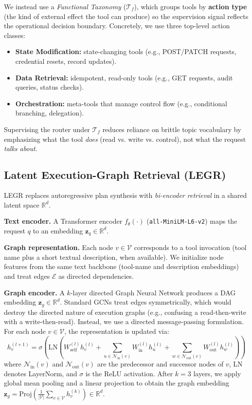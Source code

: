 \documentclass{article}
\begin{document}
We instead use a \textit{Functional Taxonomy} ($\mathcal{T}_f$), which groups tools by \textbf{action type} (the kind of external effect the tool can produce) so the supervision signal reflects the operational decision boundary. Concretely, we use three top-level action classes:
\begin{itemize}
    \item \textbf{State Modification:} state-changing tools (e.g., POST/PATCH requests, credential resets, record updates).
    \item \textbf{Data Retrieval:} idempotent, read-only tools (e.g., GET requests, audit queries, status checks).
    \item \textbf{Orchestration:} meta-tools that manage control flow (e.g., conditional branching, delegation).
\end{itemize}
Supervising the router under $\mathcal{T}_f$ reduces reliance on brittle topic vocabulary by emphasizing what the tool \emph{does} (read vs. write vs. control), not what the request \emph{talks about}.

\subsection{Latent Execution-Graph Retrieval (LEGR)}
LEGR replaces autoregressive plan synthesis with \emph{bi-encoder retrieval} in a shared latent space $\mathbb{R}^d$.

\textbf{Text encoder.} A Transformer encoder $f_\theta(\cdot)$ (\texttt{all-MiniLM-L6-v2}) maps the request $q$ to an embedding $\mathbf{z}_q \in \mathbb{R}^d$.

\textbf{Graph representation.} Each node $v\in\mathcal{V}$ corresponds to a tool invocation (tool name plus a short textual description, when available). We initialize node features from the same text backbone (tool-name and description embeddings) and treat edges $\mathcal{E}$ as directed dependencies.

\textbf{Graph encoder.} A $k$-layer directed Graph Neural Network produces a DAG embedding $\mathbf{z}_g \in \mathbb{R}^d$. Standard GCNs treat edges symmetrically, which would destroy the directed nature of execution graphs (e.g., confusing a read-then-write with a write-then-read). Instead, we use a directed message-passing formulation. For each node $v \in \mathcal{V}$, the representation is updated via:
\begin{equation}
h_v^{(l+1)} = \sigma \left( \text{LN} \left( W_{\text{self}}^{(l)} h_v^{(l)} + \sum_{u \in \mathcal{N}_{\text{in}}(v)} W_{\text{in}}^{(l)} h_u^{(l)} + \sum_{w \in \mathcal{N}_{\text{out}}(v)} W_{\text{out}}^{(l)} h_w^{(l)} \right) \right)
\end{equation}
where $\mathcal{N}_{\text{in}}(v)$ and $\mathcal{N}_{\text{out}}(v)$ are the predecessor and successor nodes of $v$, $\text{LN}$ denotes LayerNorm, and $\sigma$ is the ReLU activation. After $k=3$ layers, we apply global mean pooling and a linear projection to obtain the graph embedding $\mathbf{z}_g = \text{Proj}(\frac{1}{|\mathcal{V}|} \sum_{v \in \mathcal{V}} h_v^{(k)}) \in \mathbb{R}^d$.
\end{document}
